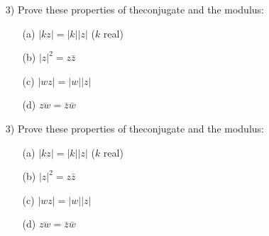 \documentclass{article}
\begin{document}
\begin{enumerate}
\item[3)] Prove these properties of theconjugate and the modulus:
\begin{enumerate}
\item[(a)] $|kz|=|k||z|$ ($k$ real)
\item[(b)] $|z|^2=z\bar{z}$
\item[(c)] $|wz|=|w||z|$
\item[(d)] $\overline{zw}=\bar{z}\bar{w}$
\end{enumerate}

\end{enumerate}


\newpage
\begin{enumerate}
\item[3)] Prove these properties of theconjugate and the modulus:
\begin{enumerate}
\item[(a)] $|kz|=|k||z|$ ($k$ real)
\[\]
\item[(b)] $|z|^2=z\bar{z}$
\item[(c)] $|wz|=|w||z|$
\item[(d)] $\overline{zw}=\bar{z}\bar{w}$
\end{enumerate}

\end{enumerate}
\end{document}
